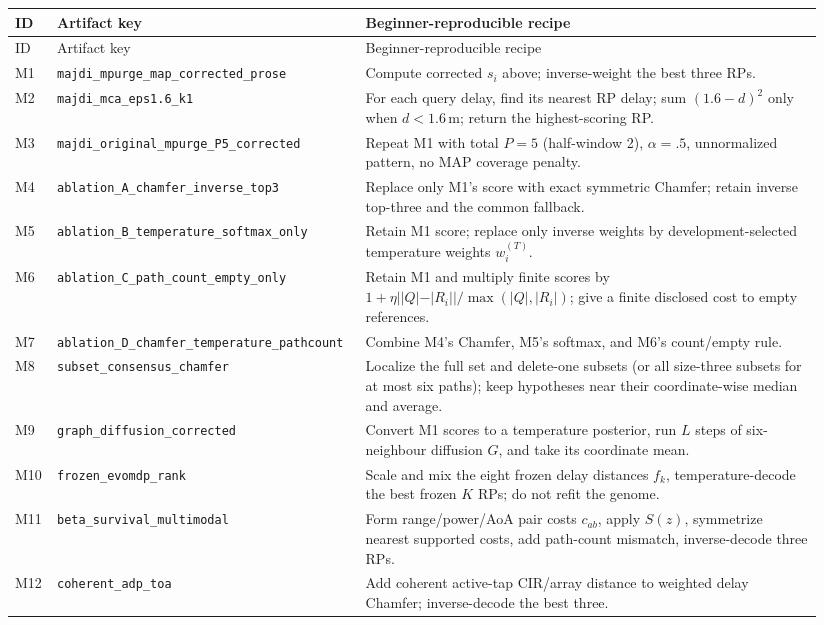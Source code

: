 \documentclass[10pt]{article}
\newcommand{\code}[1]{\nolinkurl{#1}}
\newcommand{\m}{\,\mathrm m}
\begin{document}
\footnotesize
\begin{longtable}{@{}p{0.055\linewidth}p{0.34\linewidth}p{0.55\linewidth}@{}}
\toprule
ID & Artifact key & Beginner-reproducible recipe\\
\midrule
\endfirsthead
\toprule ID & Artifact key & Beginner-reproducible recipe\\\midrule
\endhead
M1 & \code{majdi_mpurge_map_corrected_prose} & Compute corrected $s_i$ above; inverse-weight the best three RPs.\\
M2 & \code{majdi_mca_eps1.6_k1} & For each query delay, find its nearest RP delay; sum $(1.6-d)^2$ only when $d<1.6\m$; return the highest-scoring RP.\\
M3 & \code{majdi_original_mpurge_P5_corrected} & Repeat M1 with total $P=5$ (half-window 2), $\alpha=.5$, unnormalized pattern, no MAP coverage penalty.\\
M4 & \code{ablation_A_chamfer_inverse_top3} & Replace only M1's score with exact symmetric Chamfer; retain inverse top-three and the common fallback.\\
M5 & \code{ablation_B_temperature_softmax_only} & Retain M1 score; replace only inverse weights by development-selected temperature weights $w_i^{(T)}$.\\
M6 & \code{ablation_C_path_count_empty_only} & Retain M1 and multiply finite scores by $1+\eta||Q|-|R_i||/\max(|Q|,|R_i|)$; give a finite disclosed cost to empty references.\\
M7 & \code{ablation_D_chamfer_temperature_pathcount} & Combine M4's Chamfer, M5's softmax, and M6's count/empty rule.\\
M8 & \code{subset_consensus_chamfer} & Localize the full set and delete-one subsets (or all size-three subsets for at most six paths); keep hypotheses near their coordinate-wise median and average.\\
M9 & \code{graph_diffusion_corrected} & Convert M1 scores to a temperature posterior, run $L$ steps of six-neighbour diffusion $G$, and take its coordinate mean.\\
M10 & \code{frozen_evomdp_rank} & Scale and mix the eight frozen delay distances $f_k$, temperature-decode the best frozen $K$ RPs; do not refit the genome.\\
M11 & \code{beta_survival_multimodal} & Form range/power/AoA pair costs $c_{ab}$, apply $S(z)$, symmetrize nearest supported costs, add path-count mismatch, inverse-decode three RPs.\\
M12 & \code{coherent_adp_toa} & Add coherent active-tap CIR/array distance to weighted delay Chamfer; inverse-decode the best three.\\

\end{longtable}
\end{document}
